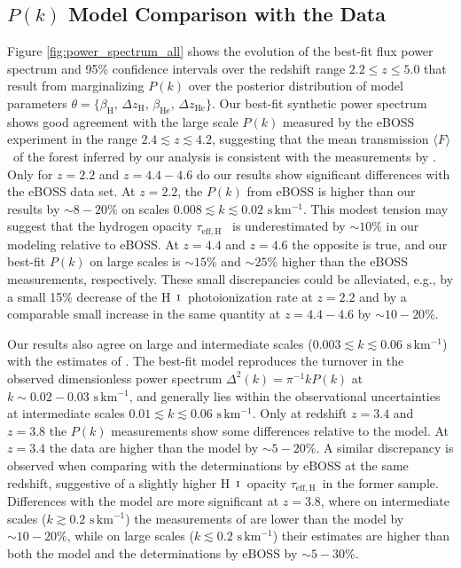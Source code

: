 \documentclass[twocolumn]{aastex62}
\def\HI{\hbox{\rm H~$\scriptstyle\rm I$}}
\newcommand\Fmean{$\langle F \rangle$~}
\newcommand\taueffH{$\tau_{\mathrm{eff,H}}$~}
\begin{document}
\subsection{$P(k)$ Model Comparison with the Data} \label{sec:results_model}

Figure \ref{fig:power_spectrum_all} shows the evolution of the
best-fit flux power spectrum and 95\% confidence intervals
over the redshift range $2.2 \leq z \leq 5.0$ that result from marginalizing $P(k)$ over the posterior
distribution of model parameters
$\theta= \{ \beta_{\mathrm{H}},\,\Delta z_{\mathrm{H}},\, \beta_{\mathrm{He}},\,\Delta z_{\mathrm{He}}\}$.
Our best-fit synthetic power spectrum shows
good agreement with the large scale $P(k)$ measured by the eBOSS experiment \citep{Chabanier+2019} 
in the range $2.4 \lesssim z \lesssim 4.2$, suggesting that the mean transmission \Fmean of the forest
inferred by our analysis is consistent with the measurements by \citet{Chabanier+2019}.
Only for $z=2.2$ and $z=4.4 - 4.6$ do our
results show significant differences with the eBOSS data set. 
At $z=2.2$, the $P(k)$ from eBOSS is higher than our results  by $\sim 8 - 20 \%$ 
on scales $0.008 \lesssim k \lesssim 0.02 \,\, \mathrm{s\,km^{-1}}$. 
This modest tension may suggest that the hydrogen opacity \taueffH
is underestimated by $\sim 10 \%$ in our modeling
relative to eBOSS.
At $z=4.4$ and $z=4.6$ the opposite is true, and
our best-fit $P(k)$ on large scales is $\sim 15\%$ and $\sim 25\%$ higher than the eBOSS measurements, respectively.
These small discrepancies could be alleviated, e.g., by a small 15\% decrease of the \HI\ photoionization rate at $z=2.2$ and by a comparable small increase in the same quantity at $z=4.4 - 4.6$ by $\sim 10 - 20\%$.

Our results also agree on large and intermediate scales 
($ 0.003 \lesssim k \lesssim 0.06 \,\, \mathrm{s \, km^{-1}}$) with the estimates of \cite{Irsic+2017a}. 
The best-fit model reproduces the turnover in the observed dimensionless power spectrum 
$\Delta^2(k)=\pi^{-1}kP(k)$ at  $k\sim 0.02-0.03 \,\, \mathrm{s \, km^{-1}}$, 
and generally lies within the observational uncertainties at intermediate scales 
$ 0.01 \lesssim k \lesssim 0.06  \,\, \mathrm{s \, km^{-1}}$. 
Only at redshift $z=3.4$ and $z=3.8$ the $P(k)$ measurements show some differences relative to the model. 
At $z=3.4$ the data are higher than the model by $\sim 5-20\%$.
A similar discrepancy is observed when comparing 
\cite{Irsic+2017a} with the determinations by eBOSS at the same redshift, suggestive
of a slightly higher \HI\ opacity \taueffH in the former sample.
Differences with the model are more significant at $z=3.8$, where
on intermediate scales ($k \gtrsim 0.2 \,\, \mathrm{s \, km^{-1}}$) the measurements of 
\cite{Irsic+2017a} are lower than the model by $\sim 10-20\%$,  while on large scales ($k \lesssim 0.2 \,\, \mathrm{s \, km^{-1}}$) their estimates are higher than both the 
model and the determinations by eBOSS by $\sim 5 - 30\%$.
\end{document}

